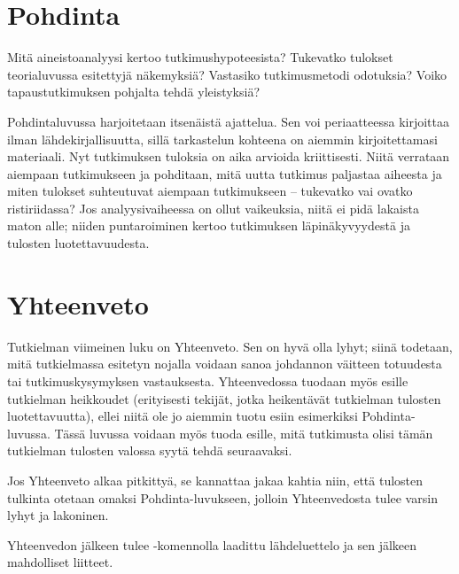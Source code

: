 \documentclass[utf8]{gradu3}
\begin{document}
\chapter{Pohdinta}

Mitä aineistoanalyysi kertoo tutkimushypoteesista? Tukevatko tulokset teorialuvussa esitettyjä näkemyksiä? Vastasiko tutkimusmetodi odotuksia? Voiko tapaustutkimuksen pohjalta tehdä yleistyksiä?

Pohdintaluvussa harjoitetaan itsenäistä ajattelua. Sen voi periaatteessa kirjoittaa ilman lähdekirjallisuutta, sillä tarkastelun kohteena on aiemmin kirjoitettamasi materiaali. Nyt tutkimuksen tuloksia on aika arvioida kriittisesti. Niitä verrataan aiempaan tutkimukseen ja pohditaan, mitä uutta tutkimus paljastaa aiheesta ja miten tulokset suhteutuvat aiempaan tutkimukseen – tukevatko vai ovatko ristiriidassa? Jos analyysivaiheessa on ollut vaikeuksia, niitä ei pidä lakaista maton alle; niiden puntaroiminen kertoo tutkimuksen läpinäkyvyydestä ja tulosten luotettavuudesta. 

\chapter{Yhteenveto}

Tutkielman viimeinen luku on Yhteenveto.  Sen on hyvä olla lyhyt; siinä todetaan, mitä tutkielmassa esitetyn nojalla voidaan sanoa johdannon väitteen totuudesta tai tutkimuskysymyksen vastauksesta. Yhteenvedossa tuodaan myös esille tutkielman heikkoudet (erityisesti tekijät, jotka heikentävät tutkielman tulosten luotettavuutta), ellei niitä ole jo aiemmin tuotu esiin esimerkiksi Pohdinta-luvussa. Tässä luvussa voidaan myös tuoda esille, mitä tutkimusta olisi tämän
tutkielman tulosten valossa syytä tehdä seuraavaksi.

Jos Yhteenveto alkaa pitkittyä, se kannattaa jakaa kahtia niin, että tulosten tulkinta otetaan omaksi Pohdinta-luvukseen, jolloin Yhteenvedosta tulee varsin lyhyt ja lakoninen.

Yhteenvedon jälkeen tulee \string\printbibliography-komennolla laadittu lähdeluettelo ja sen jälkeen mahdolliset liitteet.


\printbibliography

%

\appendix
\end{document}
